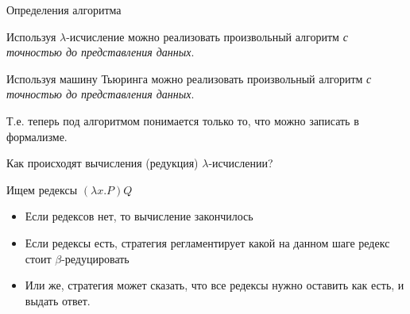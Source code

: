 \begin{frame}{Определения алгоритма}
 \begin{theorem}
  Используя $\lambda$-исчисление можно реализовать произвольный алгоритм
  \emph{с точностью до представления данных}.
\end{theorem}
\begin{theorem}
Используя машину Тьюринга можно реализовать произвольный алгоритм
\emph{с точностью до представления данных}.
\end{theorem}
Т.е. теперь под алгоритмом понимается только то, что можно записать в формализме.
\end{frame}

\begin{frame}{Как происходят вычисления (редукция) $\lambda$-исчислении?}
  \begin{definition}
    Ищем редексы $(\lambda x. P)Q$
    \begin{itemize}
      \item Если редексов нет, то вычисление закончилось
      \item Если редексы есть, стратегия регламентирует какой на данном шаге редекс стоит $\beta$-редуцировать
      \item Или же, стратегия может сказать, что все редексы нужно оставить как есть, и выдать ответ.
    \end{itemize}
  \end{definition}
\end{frame}

